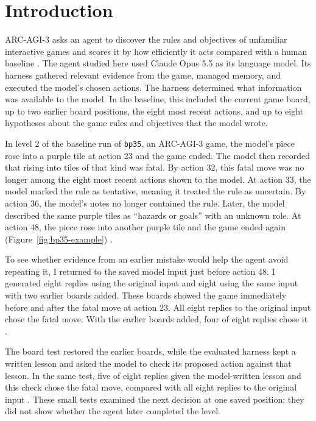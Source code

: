 \section{Introduction}\label{sec:introduction}
ARC-AGI-3 asks an agent to discover the rules and objectives of unfamiliar interactive games and scores it by how efficiently it acts compared with a human baseline \citep{arc2026technical}. The agent studied here used Claude Opus 5.5 as its language model. Its harness gathered relevant evidence from the game, managed memory, and executed the model's chosen actions. The harness determined what information was available to the model. In the baseline, this included the current game board, up to two earlier board positions, the eight most recent actions, and up to eight hypotheses about the game rules and objectives that the model wrote.

In level 2 of the baseline run of \texttt{bp35}, an ARC-AGI-3 game, the model's piece rose into a purple tile at action 23 and the game ended. The model then recorded that rising into tiles of that kind was fatal. By action 32, this fatal move was no longer among the eight most recent actions shown to the model. At action 33, the model marked the rule as tentative, meaning it treated the rule as uncertain. By action 36, the model's notes no longer contained the rule. Later, the model described the same purple tiles as ``hazards or goals'' with an unknown role. At action 48, the piece rose into another purple tile and the game ended again (Figure~\ref{fig:bp35-example}) \citep{dai2026memoryfix}.



To see whether evidence from an earlier mistake would help the agent avoid repeating it, I returned to the saved model input just before action 48. I generated eight replies using the original input and eight using the same input with two earlier boards added. These boards showed the game immediately before and after the fatal move at action 23. All eight replies to the original input chose the fatal move. With the earlier boards added, four of eight replies chose it \citep{dai2026positiontest}.

The board test restored the earlier boards, while the evaluated harness kept a written lesson and asked the model to check its proposed action against that lesson. In the same test, five of eight replies given the model-written lesson and this check chose the fatal move, compared with all eight replies to the original input \citep{dai2026memoryfix}. These small tests examined the next decision at one saved position; they did not show whether the agent later completed the level.

